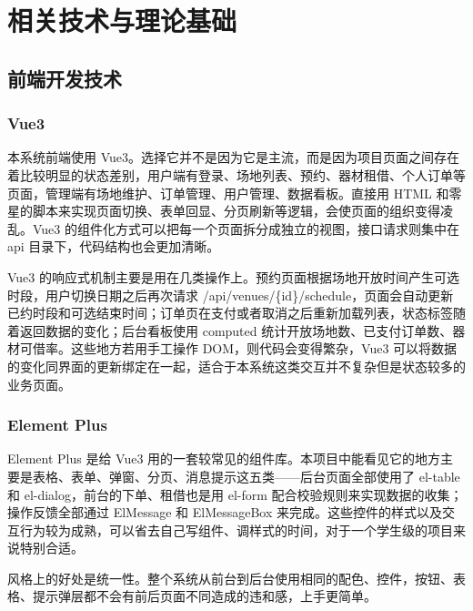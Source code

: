 
\chapter{相关技术与理论基础}

\section{前端开发技术}

\subsection{Vue3}

本系统前端使用 Vue3。选择它并不是因为它是主流，而是因为项目页面之间存在着比较明显的状态差别，用户端有登录、场地列表、预约、器材租借、个人订单等页面，管理端有场地维护、订单管理、用户管理、数据看板。直接用 HTML 和零星的脚本来实现页面切换、表单回显、分页刷新等逻辑，会使页面的组织变得凌乱。Vue3 的组件化方式可以把每一个页面拆分成独立的视图，接口请求则集中在 api 目录下，代码结构也会更加清晰\cite{wang2020}。

Vue3 的响应式机制主要是用在几类操作上。预约页面根据场地开放时间产生可选时段，用户切换日期之后再次请求 /api/venues/\{id\}/schedule，页面会自动更新已约时段和可选结束时间；订单页在支付或者取消之后重新加载列表，状态标签随着返回数据的变化；后台看板使用 computed 统计开放场地数、已支付订单数、器材可借率。这些地方若用手工操作 DOM，则代码会变得繁杂，Vue3 可以将数据的变化同界面的更新绑定在一起，适合于本系统这类交互并不复杂但是状态较多的业务页面。

\subsection{Element Plus}

Element Plus 是给 Vue3 用的一套较常见的组件库。本项目中能看见它的地方主要是表格、表单、弹窗、分页、消息提示这五类——后台页面全部使用了 el-table 和 el-dialog，前台的下单、租借也是用 el-form 配合校验规则来实现数据的收集；操作反馈全部通过 ElMessage 和 ElMessageBox 来完成\cite{zhang2019}。这些控件的样式以及交互行为较为成熟，可以省去自己写组件、调样式的时间，对于一个学生级的项目来说特别合适。

风格上的好处是统一性。整个系统从前台到后台使用相同的配色、控件，按钮、表格、提示弹层都不会有前后页面不同造成的违和感，上手更简单。

